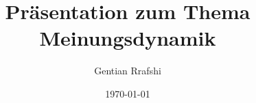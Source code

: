 \documentclass{beamer}
\title{Präsentation zum Thema Meinungsdynamik}
\author{Gentian Rrafshi}
\date{\today}
\newcommand{\1}{^{-1}}
\newcommand{\2}{^{-2}}
\newcommand{\3}{^{-3}}
\newcommand{\4}{^{-4}}
\newcommand{\5}{^{-5}}
\newcommand{\6}{^{-6}}
\newcommand{\7}{^{-7}}
\newcommand{\8}{^{-8}}
\newcommand{\9}{^{-9}}
\begin{document}
\begin{frame}
\titlepage
\end{frame} 

{
\usebackgroundtemplate{\texttt{[image: 0]}}
\begin{frame}[plain]

\end{frame}
}

{
\usebackgroundtemplate{\texttt{[image: 1]}}
\begin{frame}[plain]

\end{frame}
}

{
\usebackgroundtemplate{\texttt{[image: 2]}}
\begin{frame}[plain]

\end{frame}
}

{
\usebackgroundtemplate{\texttt{[image: 3]}}
\begin{frame}[plain]

\end{frame}
}

{
\usebackgroundtemplate{\texttt{[image: 4]}}
\begin{frame}[plain]

\end{frame}
}

{
\usebackgroundtemplate{\texttt{[image: 5]}}
\begin{frame}[plain]

\end{frame}
}

{
\usebackgroundtemplate{\texttt{[image: 6]}}
\begin{frame}[plain]

\end{frame}
}

{
\usebackgroundtemplate{\texttt{[image: 7]}}
\begin{frame}[plain]

\end{frame}
}

{
\usebackgroundtemplate{\texttt{[image: 8]}}
\begin{frame}[plain]

\end{frame}
}

{
\usebackgroundtemplate{\texttt{[image: 9]}}
\begin{frame}[plain]

\end{frame}
}
\end{document}
